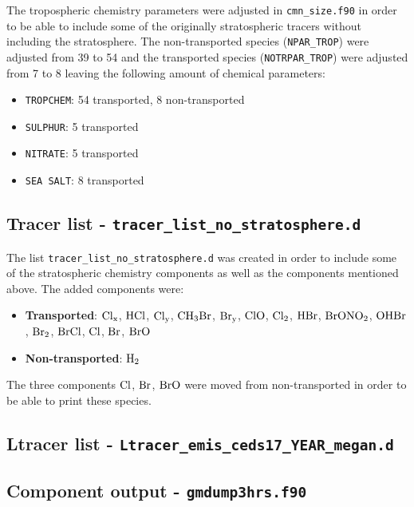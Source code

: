 The tropospheric chemistry parameters were adjusted in \texttt{cmn\_size.f90} in order to be able to include some of the originally stratospheric tracers without including the stratosphere. The non-transported species (\texttt{NPAR\_TROP}) were adjusted from 39 to 54 and the transported species (\texttt{NOTRPAR\_TROP}) were adjusted from 7 to 8 leaving the following amount of chemical parameters:

\begin{itemize}
    \item \texttt{TROPCHEM}: 54 transported, 8 non-transported
    \item \texttt{SULPHUR}: 5 transported
    \item \texttt{NITRATE}: 5 transported
    \item \texttt{SEA SALT}: 8 transported
\end{itemize}



\subsection{Tracer list - \texttt{tracer\_list\_no\_stratosphere.d}}\label{subsubsec:tracer_list}

The list \texttt{tracer\_list\_no\_stratosphere.d} was created in order to include some of the stratospheric chemistry components as well as the components mentioned above. The added components were: 

\begin{itemize}
    \item \textbf{Transported}: $\mathrm{Cl_x}$, $\mathrm{HCl}$, $\mathrm{Cl_y}$, $\mathrm{CH_3Br}$, $\mathrm{Br_y}$, $\mathrm{ClO}$, $\mathrm{Cl_2}$, $\mathrm{HBr}$, $\mathrm{BrONO_2}$, $\mathrm{OHBr}$, $\mathrm{Br_2}$, $\mathrm{BrCl}$, $\mathrm{Cl}$, $\mathrm{Br}$, $\mathrm{BrO}$
    \item \textbf{Non-transported}: $\mathrm{H_2}$
\end{itemize}

The three components $\mathrm{Cl}$, $\mathrm{Br}$, $\mathrm{BrO}$ were moved from non-transported in order to be able to print these species. 

\subsection{Ltracer list - \texttt{Ltracer\_emis\_ceds17\_YEAR\_megan.d}}\label{subsubsec:Ltracer_list}


\subsection{Component output - \texttt{gmdump3hrs.f90}}\label{subsubsec:gmdump}


